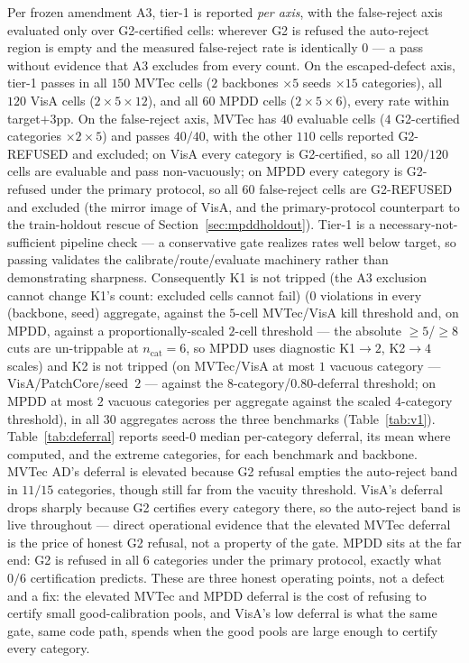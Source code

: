 \documentclass[preprint,11pt]{elsarticle}
\begin{document}
Per frozen amendment A3, tier-1 is reported \emph{per axis}, with the false-reject axis
evaluated only over G2-certified cells: wherever G2 is refused the auto-reject region is empty
and the measured false-reject rate is identically $0$ --- a pass without evidence that A3
excludes from every count. On the escaped-defect axis, tier-1 passes in all $150$
MVTec cells ($2$ backbones $\times 5$ seeds $\times 15$ categories), all $120$
VisA cells ($2 \times 5 \times 12$), and all $60$ MPDD cells ($2 \times 5 \times 6$),
every rate within target$+3$pp. On the false-reject
axis, MVTec has $40$ evaluable cells ($4$ G2-certified categories $\times 2 \times 5$) and
passes $40/40$, with the other $110$ cells reported G2-REFUSED and excluded; on VisA
every category is G2-certified, so all $120/120$ cells are evaluable and pass
non-vacuously; on MPDD every category is G2-refused under the primary protocol, so all $60$
false-reject cells are G2-REFUSED and excluded (the mirror image of VisA, and the primary-protocol
counterpart to the train-holdout rescue of Section~\ref{sec:mpddholdout}). Tier-1 is a necessary-not-sufficient pipeline check --- a conservative gate
realizes rates well below target, so passing validates the calibrate/route/evaluate machinery
rather than demonstrating sharpness. Consequently K1 is not tripped (the A3 exclusion
cannot change K1's count: excluded cells cannot fail) ($0$ violations in every
(backbone, seed) aggregate, against the $5$-cell MVTec/VisA kill threshold and, on MPDD, against
a proportionally-scaled $2$-cell threshold --- the absolute $\ge 5$/$\ge 8$ cuts are un-trippable at
$n_{\text{cat}}=6$, so MPDD uses diagnostic K1$\to 2$, K2$\to 4$ scales) and K2 is
not tripped (on MVTec/VisA at most $1$ vacuous category --- VisA/PatchCore/seed~$2$ --- against the
$8$-category/$0.80$-deferral threshold; on MPDD at most $2$ vacuous categories per aggregate
against the scaled $4$-category threshold), in all $30$ aggregates across the three
benchmarks (Table~\ref{tab:v1}). Table~\ref{tab:deferral} reports seed-$0$ median per-category deferral, its mean where computed,
and the extreme categories, for each benchmark and backbone. MVTec AD's deferral is elevated
because G2 refusal empties the auto-reject band in $11/15$ categories, though still far from the
vacuity threshold. VisA's deferral drops sharply because G2 certifies every category there, so the
auto-reject band is live throughout --- direct operational evidence that the elevated MVTec
deferral is the price of honest G2 refusal, not a property of the gate. MPDD sits at the far end:
G2 is refused in all $6$ categories under the primary protocol, exactly what $0/6$ certification
predicts. These are three honest operating points, not a defect and a fix: the elevated MVTec and
MPDD deferral is the cost of refusing to certify small good-calibration pools, and VisA's low
deferral is what the same gate, same code path, spends when the good pools are large enough to
certify every category.
\end{document}

